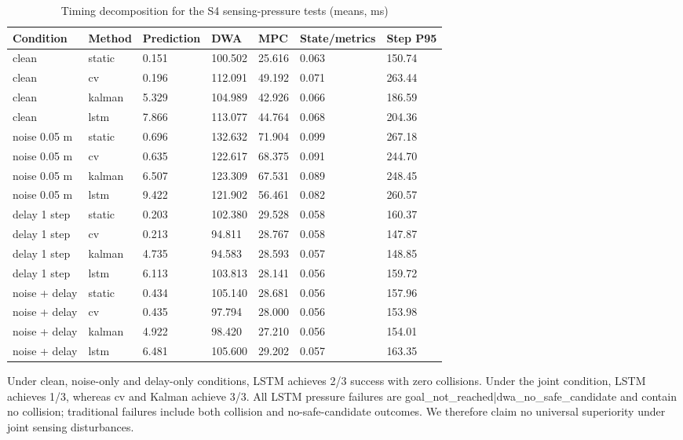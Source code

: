 \documentclass[10pt,a4paper]{article}
\begin{document}
\begin{table}[t]
\centering
\small
\caption{Timing decomposition for the S4 sensing-pressure tests (means, ms)}
\label{tab:table-8}
\begin{tabularx}{\linewidth}{YYYYYYY}
\toprule
Condition & Method & Prediction & DWA & MPC & State/metrics & Step P95 \\
\midrule
clean & static & 0.151 & 100.502 & 25.616 & 0.063 & 150.74 \\
clean & cv & 0.196 & 112.091 & 49.192 & 0.071 & 263.44 \\
clean & kalman & 5.329 & 104.989 & 42.926 & 0.066 & 186.59 \\
clean & lstm & 7.866 & 113.077 & 44.764 & 0.068 & 204.36 \\
noise 0.05 m & static & 0.696 & 132.632 & 71.904 & 0.099 & 267.18 \\
noise 0.05 m & cv & 0.635 & 122.617 & 68.375 & 0.091 & 244.70 \\
noise 0.05 m & kalman & 6.507 & 123.309 & 67.531 & 0.089 & 248.45 \\
noise 0.05 m & lstm & 9.422 & 121.902 & 56.461 & 0.082 & 260.57 \\
delay 1 step & static & 0.203 & 102.380 & 29.528 & 0.058 & 160.37 \\
delay 1 step & cv & 0.213 & 94.811 & 28.767 & 0.058 & 147.87 \\
delay 1 step & kalman & 4.735 & 94.583 & 28.593 & 0.057 & 148.85 \\
delay 1 step & lstm & 6.113 & 103.813 & 28.141 & 0.056 & 159.72 \\
noise + delay & static & 0.434 & 105.140 & 28.681 & 0.056 & 157.96 \\
noise + delay & cv & 0.435 & 97.794 & 28.000 & 0.056 & 153.98 \\
noise + delay & kalman & 4.922 & 98.420 & 27.210 & 0.056 & 154.01 \\
noise + delay & lstm & 6.481 & 105.600 & 29.202 & 0.057 & 163.35 \\
\bottomrule
\end{tabularx}
\end{table}

Under clean, noise-only and delay-only conditions, LSTM achieves 2/3 success with zero collisions. Under the joint condition, LSTM achieves 1/3, whereas cv and Kalman achieve 3/3. All LSTM pressure failures are goal\_not\_reached|dwa\_no\_safe\_candidate and contain no collision; traditional failures include both collision and no-safe-candidate outcomes. We therefore claim no universal superiority under joint sensing disturbances.
\end{document}

